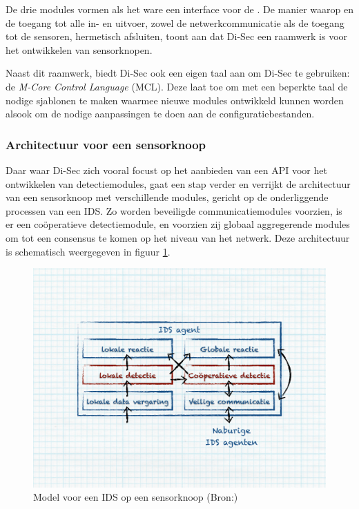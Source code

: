 De drie modules vormen als het ware een interface voor de . De manier
waarop  en  de toegang tot alle in- en uitvoer, zowel de
netwerkcommunicatie als de toegang tot de sensoren, hermetisch afsluiten, toont
aan dat Di-Sec een raamwerk is voor het ontwikkelen van sensorknopen.

Naast dit raamwerk, biedt Di-Sec ook een eigen taal aan om Di-Sec te gebruiken:
de \emph{M-Core Control Language} (MCL). Deze laat toe om met een beperkte taal
de nodige sjablonen te maken waarmee nieuwe modules ontwikkeld kunnen worden
alsook om de nodige aanpassingen te doen aan de configuratiebestanden.

\subsubsection*{Architectuur voor een sensorknoop}
\label{subsubsection:node-architecture}

Daar waar Di-Sec zich vooral focust op het aanbieden van een API voor het
ontwikkelen van detectiemodules, gaat \citep{zhang2000intrusion} een stap
verder en verrijkt de architectuur van een sensorknoop met verschillende
modules, gericht op de onderliggende processen van een IDS. Zo worden
beveiligde communicatiemodules voorzien, is er een co\"operatieve
detectiemodule, en voorzien zij globaal aggregerende modules om tot een
consensus te komen op het niveau van het netwerk. Deze architectuur is
schematisch weergegeven in figuur \ref{fig:node-architecture}.

\begin{figure}[ht]
  \centering
  \includegraphics[width=0.9\linewidth]{resources/node-architecture.pdf}
  \caption[Model voor een IDS op een sensorknoop]{Model voor een IDS op een
  sensorknoop (Bron:\citep{zhang2000intrusion})}
  \label{fig:node-architecture}
\end{figure}


